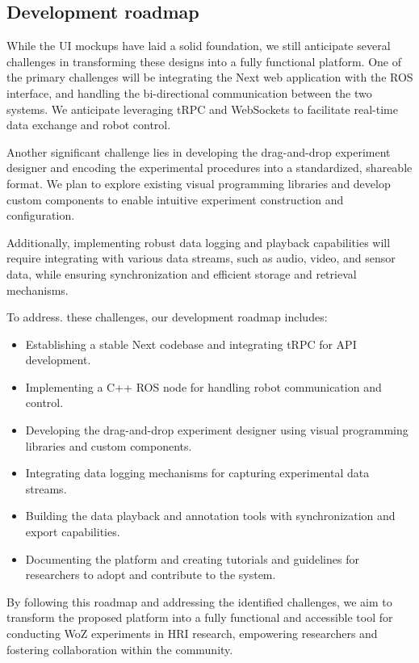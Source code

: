 \documentclass[letterpaper, 10 pt, conference]{ieeeconf}
\begin{document}
\subsection{Development roadmap}

While the UI mockups have laid a solid foundation, we still anticipate several challenges in transforming these designs into a fully functional platform. One of the primary challenges will be integrating the Next web application with the ROS interface, and handling the bi-directional communication between the two systems. We anticipate leveraging tRPC and WebSockets to facilitate real-time data exchange and robot control. 

Another significant challenge lies in developing the drag-and-drop experiment designer and encoding the experimental procedures into a standardized, shareable format. We plan to explore existing visual programming libraries and develop custom components to enable intuitive experiment construction and configuration.

Additionally, implementing robust data logging and playback capabilities will require integrating with various data streams, such as audio, video, and sensor data, while ensuring synchronization and efficient storage and retrieval mechanisms. 

To address. these challenges, our development roadmap includes:
\begin{itemize}
	\item Establishing a stable Next codebase and integrating tRPC for API development. 
	\item Implementing a C++ ROS node for handling robot communication and control.
	\item Developing the drag-and-drop experiment designer using visual programming libraries and custom components.
	\item Integrating data logging mechanisms for capturing experimental data streams. 
	\item Building the data playback and annotation tools with synchronization and export capabilities.
	\item Documenting the platform and creating tutorials and guidelines for researchers to adopt and contribute to the system.
\end{itemize}

By following this roadmap and addressing the identified challenges, we aim to transform the proposed platform into a fully functional and accessible tool for conducting WoZ experiments in HRI research, empowering researchers and fostering collaboration within the community. 
\end{document}
